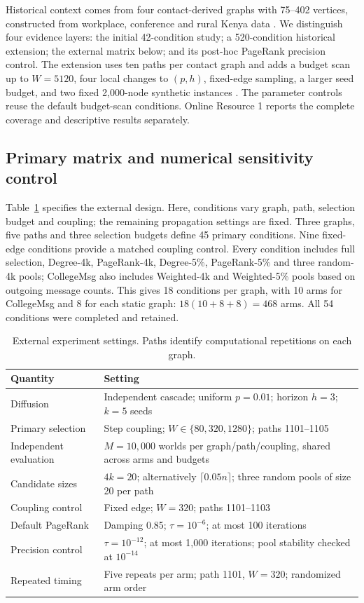 \documentclass[smallextended]{svjour3}
\begin{document}
Historical context comes from four contact-derived graphs with 75--402 vertices, constructed from workplace, conference and rural Kenya data \cite{ref3,ref4,ref5,ref6}. We distinguish four evidence layers: the initial 42-condition study; a 520-condition historical extension; the external matrix below; and its post-hoc PageRank precision control. The extension uses ten paths per contact graph and adds a budget scan up to $W=5120$, four local changes to $(p,h)$, fixed-edge sampling, a larger seed budget, and two fixed 2,000-node synthetic instances \cite{ref17,ref18}. The parameter controls reuse the default budget-scan conditions. Online Resource 1 reports the complete coverage and descriptive results separately.

\subsection{Primary matrix and numerical sensitivity control}
Table~\ref{tab:settings} specifies the external design. Here, conditions vary graph, path, selection budget and coupling; the remaining propagation settings are fixed. Three graphs, five paths and three selection budgets define 45 primary conditions. Nine fixed-edge conditions provide a matched coupling control. Every condition includes full selection, Degree-4k, PageRank-4k, Degree-5\%, PageRank-5\% and three random-4k pools; CollegeMsg also includes Weighted-4k and Weighted-5\% pools based on outgoing message counts. This gives 18 conditions per graph, with 10 arms for CollegeMsg and 8 for each static graph: $18(10+8+8)=468$ arms. All 54 conditions were completed and retained.

\begin{table}[htbp]
\caption{External experiment settings. Paths identify computational repetitions on each graph.}\label{tab:settings}
\begin{tabularx}{\linewidth}{lX}
\toprule
Quantity & Setting \\
\midrule
Diffusion & Independent cascade; uniform $p=0.01$; horizon $h=3$; $k=5$ seeds \\
Primary selection & Step coupling; $W\in\{80,320,1280\}$; paths 1101--1105 \\
Independent evaluation & $M=10,000$ worlds per graph/path/coupling, shared across arms and budgets \\
Candidate sizes & $4k=20$; alternatively $\lceil0.05n\rceil$; three random pools of size 20 per path \\
Coupling control & Fixed edge; $W=320$; paths 1101--1103 \\
Default PageRank & Damping 0.85; $\tau=10^{-6}$; at most 100 iterations \\
Precision control & $\tau=10^{-12}$; at most 1,000 iterations; pool stability checked at $10^{-14}$ \\
Repeated timing & Five repeats per arm; path 1101, $W=320$; randomized arm order \\
\bottomrule
\end{tabularx}
\end{table}
\end{document}
